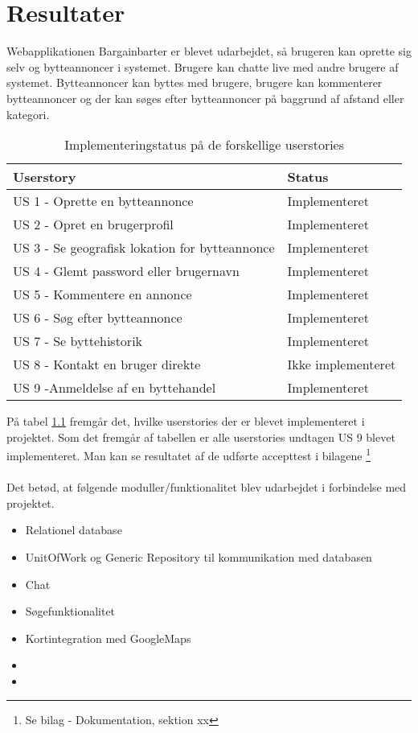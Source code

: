 \chapter{Resultater}\label{ch:Resultat og Diskussion}
Webapplikationen Bargainbarter er blevet udarbejdet, så brugeren kan oprette sig selv og bytteannoncer i systemet. Brugere kan chatte live med andre brugere af systemet. Bytteannoncer kan byttes med brugere, brugere kan kommenterer bytteannoncer og der kan søges efter bytteannoncer på baggrund af afstand eller kategori.

\begin{table}[H]
	\begin{tabular}{ | l | p{5cm} |}
		\hline
		\textbf{Userstory}  & \textbf{Status} \\ \hline
		US 1 - Oprette en bytteannonce  & Implementeret \\ \hline
		US 2 - Opret en brugerprofil & Implementeret \\ \hline
		US 3 - Se geografisk lokation for bytteannonce & Implementeret \\ \hline
		US 4 - Glemt password eller brugernavn & Implementeret \\ \hline
		US 5 - Kommentere en annonce & Implementeret \\ \hline
		US 6 - Søg efter bytteannonce & Implementeret \\ \hline
		US 7 - Se byttehistorik & Implementeret \\ \hline	
		US 8 - Kontakt en bruger direkte & Ikke implementeret \\ \hline	
		US 9 -Anmeldelse af en byttehandel & Implementeret \\ \hline	
	\end{tabular}
\caption{Implementeringstatus på de forskellige userstories}
\label{fig:Implementeringsstatus}
\end{table}

På tabel \ref{fig:Implementeringsstatus} fremgår det, hvilke userstories der er blevet implementeret i projektet. Som det fremgår af tabellen er alle userstories undtagen  US 9 blevet implementeret. Man kan se resultatet af de udførte accepttest i bilagene \footnote{Se bilag - Dokumentation, sektion xx}
\\ \\
\noindent Det betød, at følgende moduller/funktionalitet blev udarbejdet i forbindelse med projektet.
\begin{itemize}[noitemsep]
	\item Relationel database
	\item UnitOfWork og Generic Repository til kommunikation med databasen
	\item Chat 
	\item Søgefunktionalitet
	\item Kortintegration med GoogleMaps
	\item 
	\item 
\end{itemize}